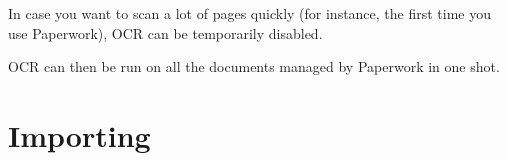 \documentclass[10pt,a4paper]{article}
\begin{document}
In case you want to scan a lot of pages quickly (for instance, the
first time you use Paperwork), OCR can be temporarily disabled.


OCR can then be run on all the documents managed by Paperwork in one
shot.



\section{Importing}

\end{document}
